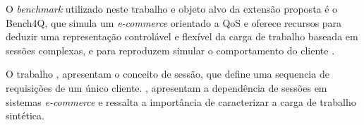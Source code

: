 

O \textit{benchmark} utilizado neste trabalho e objeto alvo da extensão proposta é o Bench4Q, que simula um \textit{e-commerce} orientado a QoS e oferece recursos para deduzir uma representação controlável e flexível da carga de trabalho baseada em sessões complexas, e para reproduzem simular o comportamento do cliente \cite{Bench4Q}.


O trabalho , apresentam o conceito de sessão, que define uma sequencia de requisições de um único cliente. , apresentam a dependência de sessões em sistemas \textit{e-commerce} e ressalta a importância de caracterizar a carga de trabalho sintética.


